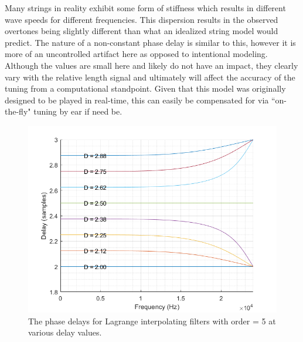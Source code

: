 \documentclass[../main.tex]{subfiles}
\begin{document}
Many strings in reality exhibit some form of stiffness which results in different wave speeds for different frequencies. This dispersion results in the observed overtones being slightly different than what an idealized string model would predict. The nature of a non-constant phase delay is similar to this, however it is more of an uncontrolled artifact here as opposed to intentional modeling. Although the values are small here and likely do not have an impact, they clearly vary with the relative length signal and ultimately will affect the accuracy of the tuning from a computational standpoint. Given that this model was originally designed to be played in real-time, this can easily be compensated for via ``on-the-fly" tuning by ear if need be.

\begin{figure}[h]
    \centering
    \includegraphics[scale=.65]{./images/plots/LagrangePhaseDelays.png}
    \caption{The phase delays for Lagrange interpolating filters with order = 5 at various delay values.}
    \label{fig:LagrangePhaseDelays}
\end{figure}
\end{document}
